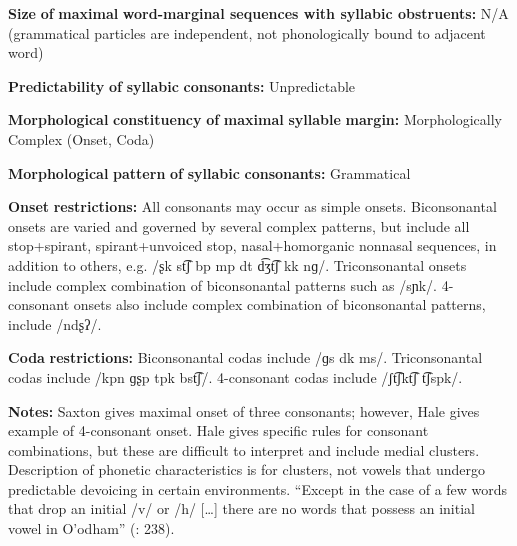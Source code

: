 \begin{styleBody}
\textbf{Size} \textbf{of} \textbf{maximal} \textbf{word{}-marginal sequences with syllabic obstruents:} N/A (grammatical particles are independent, not phonologically bound to adjacent word)
\end{styleBody}

\begin{styleBody}
\textbf{Predictability} \textbf{of} \textbf{syllabic} \textbf{consonants:} Unpredictable
\end{styleBody}

\begin{styleBody}
\textbf{Morphological} \textbf{constituency} \textbf{of} \textbf{maximal} \textbf{syllable} \textbf{margin:} Morphologically Complex (Onset, Coda)
\end{styleBody}

\begin{styleBody}
\textbf{Morphological} \textbf{pattern} \textbf{of} \textbf{syllabic} \textbf{consonants:} Grammatical
\end{styleBody}

\begin{styleBody}
\textbf{Onset} \textbf{restrictions:} All consonants may occur as simple onsets. Biconsonantal onsets are varied and governed by several complex patterns, but include all stop+spirant, spirant+unvoiced stop, nasal+homorganic nonnasal sequences, in addition to others, e.g. /ʂk st͡ʃ bp mp dt d͡ʒt͡ʃ kk nɡ/. Triconsonantal onsets include complex combination of biconsonantal patterns such as /sɲk/. 4-consonant onsets also include complex combination of biconsonantal patterns, include /ndʂʔ/.
\end{styleBody}

\begin{styleBody}
\textbf{Coda} \textbf{restrictions:} Biconsonantal codas include /ɡs dk ms/. Triconsonantal codas include /kpn ɡʂp tpk bst͡ʃ/. 4-consonant codas include /ʃt͡ʃkt͡ʃ t͡ʃspk/.
\end{styleBody}

\begin{styleBody}
\textbf{Notes:} Saxton gives maximal onset of three consonants; however, Hale gives example of 4-consonant onset. Hale gives specific rules for consonant combinations, but these are difficult to interpret and include medial clusters. Description of phonetic characteristics is for clusters, not vowels that undergo predictable devoicing in certain environments. “Except in the case of a few words that drop an initial /v/ or /h/ […] there are no words that possess an initial vowel in O’odham” (\citealt{DoloresMathiot1991}: 238).
\end{styleBody}

